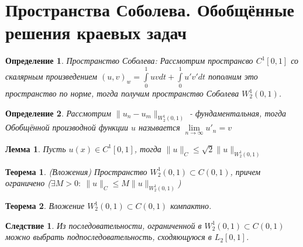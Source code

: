 \documentclass[9pt, a4paper]{extarticle}
\newtheorem{theorem}{Теорема}
\newtheorem{lemma}{Лемма}
\newtheorem{corollary}{Следствие}
\newtheorem{definition}{Определение}
\numberwithin{equation}{section}
\numberwithin{lemma}{section}
\numberwithin{definition}{section}
\numberwithin{notabene}{section}
\numberwithin{corollary}{section}
\begin{document}
		\section{Пространства Соболева. Обобщённые решения краевых задач}
		\begin{definition}
		Пространство Соболева: Рассмотрим пространсво $C^1[0,1]$ со скалярным произведением $(u,v)_w = \int\limits_0^1 uvdt + \int\limits_0^1 u'v'dt$ пополним это пространство по норме, тогда получим пространство Соболева $W_2^1(0,1)$.
		\end{definition}
		\begin{definition}
			Рассмотрим  $\| u_n - u_m\|_{W_2^1(0,1)}$ - фундаментальная, тогда Обобщённой производной функции $u$ называется $\lim\limits_{n\to\infty} u'_n = v$
		\end{definition}
	
		\begin{lemma}
			Пусть $u(x) \in C^1[0,1]$, тогда $\|u\|_C \leq \sqrt2 \|u\|_{W_2^1(0,1)}$
		\end{lemma}
		\begin{theorem}
			(Вложения)\newline
			Пространство $W_2^1(0,1) \subset C(0,1)$, причем ограничено ($\exists M > 0: \ \|u\|_C \leq M \|u\|_{W_2^1(0,1)}$)
		\end{theorem}
		\begin{theorem}
			Вложение $W_2^1(0,1) \subset C(0,1)$ компактно. 
		\end{theorem}
		\begin{corollary}
			Из последовательности, ограниченной в $W_2^1(0,1) \subset C(0,1)$ можно выбрать подпоследовательность, сходяющуюся в $L_2[0,1]$.
		\end{corollary}
\end{document}
